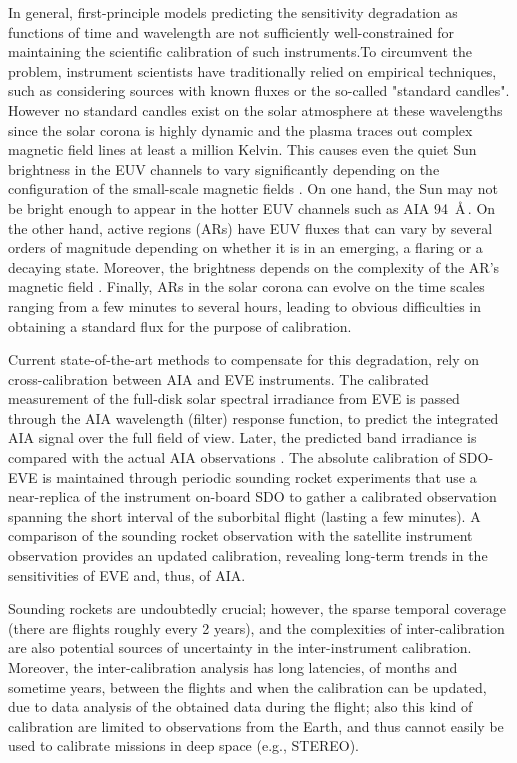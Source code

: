 \documentclass{aa}
\begin{document}
In general, first-principle models predicting the sensitivity degradation as functions of time and wavelength are not sufficiently well-constrained for maintaining the scientific calibration of such instruments.To circumvent the problem, instrument scientists have traditionally relied on empirical techniques, such as considering sources with known fluxes or the so-called "standard candles". However no standard candles exist on the solar atmosphere at these wavelengths since the solar corona is highly dynamic and the plasma traces out complex magnetic field lines at least a million Kelvin. This causes even the quiet Sun brightness in the EUV channels to vary significantly depending on the configuration of the small-scale magnetic fields \citep[][and the references therein]{2015A&A...581A..51S}. On one hand, the Sun may not be bright enough to appear in the hotter EUV channels such as AIA 94~\AA\,. On the other hand, active regions (ARs) have EUV fluxes that can vary by several orders of magnitude depending on whether it is in an emerging, a flaring or a decaying state. Moreover, the brightness depends on the complexity of the AR's  magnetic field \citep{2015LRSP...12....1V}. Finally, ARs in the solar corona can evolve on the time scales ranging from a few minutes to several hours, leading to obvious difficulties in obtaining a standard flux for the purpose of calibration. 

Current state-of-the-art methods to compensate for this degradation, rely on cross-calibration between AIA and EVE instruments. The calibrated measurement of the full-disk solar spectral irradiance from EVE is passed through the AIA wavelength (filter) response function, to predict the integrated AIA signal over the full field of view. Later, the predicted band irradiance is compared with the actual AIA observations \citep{Boerner2013}. The absolute calibration of SDO-EVE is maintained through periodic sounding rocket experiments \citep{EVE_rocket} that use a near-replica of the instrument on-board SDO to gather a calibrated observation spanning the short interval of the suborbital flight (lasting a few minutes). A comparison of the sounding rocket observation with the satellite instrument observation provides an updated calibration, revealing long-term trends in the sensitivities of EVE and, thus, of AIA. 

Sounding rockets are undoubtedly crucial; however, the sparse temporal coverage (there are flights roughly every 2 years), and the complexities of inter-calibration are also potential sources of uncertainty in the inter-instrument calibration. Moreover, the inter-calibration analysis has long latencies, of months and sometime years, between the flights and when the calibration can be updated, due to data analysis of the obtained data during the flight; also this kind of calibration are limited to observations from the Earth, and thus cannot easily be used to calibrate missions in deep space (e.g., STEREO).
\end{document}
